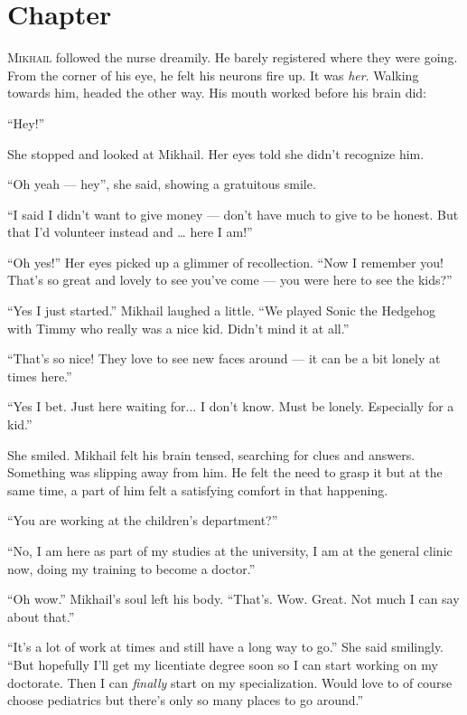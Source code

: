 \chapter{Chapter \thechapter}

\lettrine[lraise=0.1, nindent=0.1em, slope=-.5em]{M}{ikhail} followed the nurse dreamily. He barely registered where they were going. From the corner of his eye, he felt his neurons fire up. It was \textit{her}. Walking towards him, headed the other way. His mouth worked before his brain did:

“Hey!”

She stopped and looked at Mikhail. Her eyes told she didn’t recognize him.

“Oh yeah — hey”, she said, showing a gratuitous smile.

“I said I didn’t want to give money — don’t have much to give to be honest. But that I’d volunteer instead and … here I am!”

“Oh yes!” Her eyes picked up a glimmer of recollection. “Now I remember you! That’s so great and lovely to see you’ve come — you were here to see the kids?”

“Yes I just started.” Mikhail laughed a little. “We played Sonic the Hedgehog with Timmy who really was a nice kid. Didn’t mind it at all.”

“That’s so nice! They love to see new faces around — it can be a bit lonely at times here.”

“Yes I bet. Just here waiting for... I don’t know. Must be lonely. Especially for a kid.”

She smiled. Mikhail felt his brain tensed, searching for clues and answers. Something was slipping away from him. He felt the need to grasp it but at the same time, a part of him felt a satisfying comfort in that happening.

“You are working at the children’s department?”

“No, I am here as part of my studies at the university, I am at the general clinic now, doing my training to become a doctor.”

“Oh wow.” Mikhail’s soul left his body. “That’s. Wow. Great. Not much I can say about that.”

“It’s a lot of work at times and still have a long way to go.” She said smilingly. “But hopefully I’ll get my licentiate degree soon so I can start working on my doctorate. Then I can \textit{finally} start on my specialization. Would love to of course choose pediatrics but there’s only so many places to go around.”

